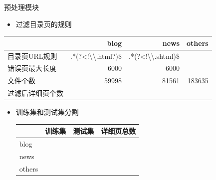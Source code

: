 \documentclass[presentation]{beamer}
\begin{document}
\begin{frame}[label=sec-3-2]{预处理模块}
\begin{itemize}
\item 过滤目录页的规则
\end{itemize}
\begin{table}[hb]
  \centering
  \begin{tabular}{lrrr}
    \toprule
    & blog & news & others \\
    \hline
    目录页URL规则 & .*(?<!\textbackslash\textbackslash.html?)\$ & .*(?<!\textbackslash\textbackslash.shtml)\$ &  \\
    错误页最大长度 & 6000 & 6000 &  \\
    文件个数 & 59998 & 81561 & 183635 \\
    过滤后详细页个数 &  &  &  \\
    \bottomrule
  \end{tabular}
\end{table}
\begin{itemize}
\item 训练集和测试集分割
\begin{table}[hb]
  \centering
  \begin{tabular}{llll}
    \toprule
    & 训练集 & 测试集 & 详细页总数 \\
    \hline
    blog &  &  &  \\
    news &  &  &  \\
    others &  &  &  \\
    \bottomrule
  \end{tabular}
\end{table}
\end{itemize}
\end{frame}
\end{document}
